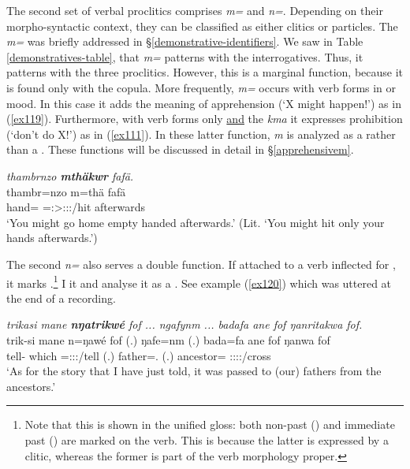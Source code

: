 The second set of verbal proclitics comprises \emph{m=} and \emph{n=}. Depending on their morpho-syntactic context, they can be classified as either clitics or particles. The \emph{m=}  was briefly addressed in \S{}\ref{demonstrative-identifiers}. We saw in Table \ref{demonstratives-table}, that \emph{m=} patterns with the interrogatives. Thus, it patterns with the three  proclitics. However, this is a marginal function, because it is found only with the copula. More frequently, \emph{m=} occurs with verb forms in  or  mood. In this case it adds the meaning of apprehension (`X might happen!') as in (\ref{ex119}). Furthermore, with  verb forms only \uline{and} the   \emph{kma} it expresses prohibition (`don't do X!') as in (\ref{ex111}). In these latter function, \emph{m} is analyzed as a  rather than a . These functions will be discussed in detail in \S{}\ref{apprehensivem}.

\begin{exe}
	\ex \emph{thambrnzo \textbf{mthäkwr} fafä.}\\
	\gll thambr=nzo m=thä fafä\\
	hand=\Only{} \Appr{}=\Ssg:\Sbj>\Stpl:\Obj:\Imp:\Pfv/hit afterwards\\
	\trans `You might go home empty handed afterwards.' (Lit. `You might hit only your hands afterwards.') 
	\label{ex119}
\end{exe}

The second  \emph{n=} also serves a double function. If attached to a verb inflected for , it marks .\footnote{Note that this is shown in the unified gloss: both non-past (\Nonpast) and immediate past (\Immpst) are marked on the verb. This is because the latter is expressed by a clitic, whereas the former is part of the verb morphology proper.} I  it \Immpst{} and analyse it as a . See example (\ref{ex120}) which was uttered at the end of a recording.

\begin{exe}
	\ex \emph{trikasi mane \textbf{nŋatrikwé} fof ... ngafynm ... badafa ane fof ŋanritakwa fof.}\\
	\gll trik-si mane n=ŋawé fof (.) ŋafe=nm (.) bada=fa ane fof ŋanwa fof\\
	tell-\Nmlz{} which \Immpst=\Fsg:\Sbj:\Nonpast:\Ipfv/tell \Emph{} (.) father=\Dat{}.\Nsg{} (.) ancestor=\Abl{} \Dem{} \Emph{} \Stsg:\Sbj:\Pst:\Ipfv:\Venit/cross \Emph{}\\
	\trans `As for the story that I have just told, it was passed to (our) fathers from the ancestors.' 
	\label{ex120}
\end{exe}

